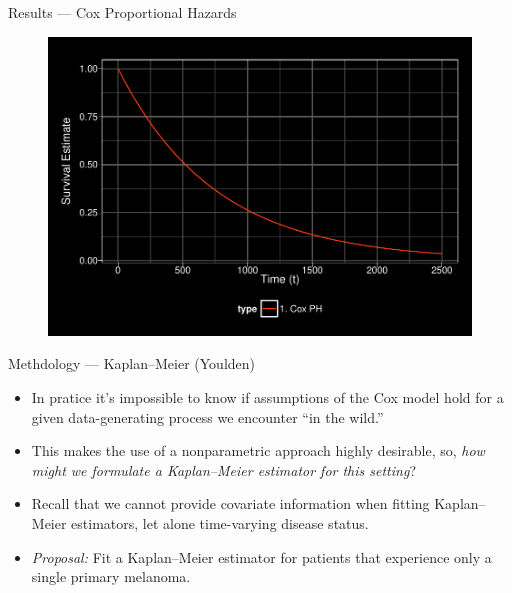 \documentclass[12pt,t]{beamer}
\begin{document}

\begin{frame}[c]{Results --- Cox Proportional Hazards}

\begin{center}
\begin{figure}[H]
\begin{center}
\includegraphics[width=\textwidth]{Figs/s1_cox.pdf}
\end{center}
\end{figure}
\end{center}

\note{
}

\end{frame}


\begin{frame}[c]{Methdology --- Kaplan--Meier (Youlden)}

\begin{center}
\begin{itemize}
  \itemsep12pt
  \item In pratice it's impossible to know if assumptions of the Cox model hold
    for a given data-generating process we encounter ``in the wild.''
  \item This makes the use of a nonparametric approach highly desirable, so,
    \textit{how might we formulate a Kaplan--Meier estimator for this setting}?
  \item Recall that we cannot provide covariate information when fitting
    Kaplan--Meier estimators, let alone time-varying disease status.
  \item \textit{Proposal:} Fit a Kaplan--Meier estimator for patients that
    experience only a single primary melanoma.
\end{itemize}
\end{center}


\end{frame}
\end{document}
